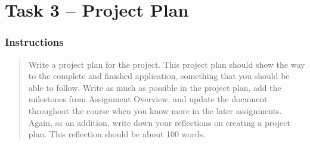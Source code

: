 %
%
%
%


\section{Task 3 -- Project Plan}\label{task-3}

\subsubsection{Instructions}\label{task-3-instructions}
\begin{quote}
  Write a project plan for the project. This project plan should show the way
  to the complete and finished application, something that you should be able
  to follow. Write as much as possible in the project plan, add the
  milestones from Assignment Overview, and update the document throughout the
  course when you know more in the later assignments.  Again, as an addition,
  write down your reflections on creating a project plan. This reflection
  should be about 100 words.
\end{quote}


